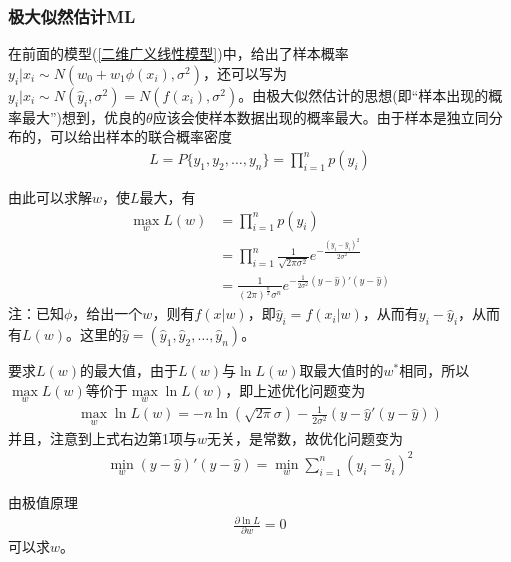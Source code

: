         \subsubsection{极大似然估计ML}
            在前面的模型(\ref{二维广义线性模型})中，给出了样本概率$y_i|x_i \sim N(w_0+w_1\phi(x_i),\sigma^2)$，还可以写为$y_i|x_i \sim N(\hat{y}_i,\sigma^2) = N(f(x_i),\sigma^2)$。由极大似然估计的思想(即“样本出现的概率最大”)想到，优良的$\theta$应该会使样本数据出现的概率最大。由于样本是独立同分布的，可以给出样本的联合概率密度
            \begin{align*}
            L = P\{y_1,y_2,\dots,y_n\} = \prod_{i=1}^np(y_i)
            \end{align*}
            \par
            由此可以求解$w$，使$L$最大，有
            \begin{align*}
            \max_w L(w) &= \prod_{i=1}^n p(y_i)\\
            &=\prod_{i=1}^n\frac{1}{\sqrt{2\pi \sigma^2}}e^{-\frac{(y_i - \hat{y}_i)^2}{2\sigma^2}}\\
            &=\frac{1}{(2\pi)^{\frac{n}{2}}\sigma^n} e^{-\frac{1}{2\sigma^2}(y-\hat{y})'(y-\hat{y})}
            \end{align*}
            注：已知$\phi$，给出一个$w$，则有$f(x|w)$，即$\hat{y}_i = f(x_i|w)$，从而有$y_i - \hat{y}_i$，从而有$L(w)$。这里的$\hat{y} = (\hat{y}_1,\hat{y}_2,\dots,\hat{y}_n)$。
            \par
            要求$L(w)$的最大值，由于$L(w)$与$\ln L(w)$取最大值时的$w^{*}$相同，所以$\mathop{\max}\limits_w L(w)$等价于$\max \limits_w\ln L(w)$，即上述优化问题变为
            \begin{align*}
            \max_w \ln L(w) = - n\ln (\sqrt{2\pi}\sigma) - \frac{1}{2\sigma^2}(y - \hat{y}'(y - \hat{y}))
            \end{align*}
            并且，注意到上式右边第1项与$w$无关，是常数，故优化问题变为
            \begin{align*}
            \min_w (y-\hat{y})'(y-\hat{y}) = \min_w \sum_{i=1}^n(y_i-\hat{y}_i)^2
            \end{align*}
            \par
            由极值原理
            \begin{align*}
            \frac{\partial \ln L}{\partial w} = 0
            \end{align*}
            可以求$w$。
